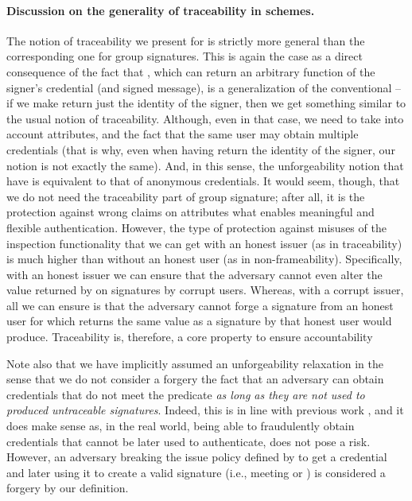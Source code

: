 \paragraph{Discussion on the generality of traceability in \UAS schemes.} %
The notion of traceability we present for \UAS is strictly more general than
the corresponding one for group signatures. This is again the case as a direct
consequence of the fact that \Inspect, which can return an arbitrary function
of the signer's credential (and signed message), is a generalization of the
conventional \Open -- if we make \Inspect return just the identity of the
signer, then we get something similar to the usual notion of traceability.
Although, even in that case, we need to take into account attributes, and the
fact that the same user may obtain multiple credentials (that is why, even when
having \Inspect return the identity of the signer, our notion is not exactly
the same). And, in this sense, the unforgeability notion that \UAS have is
equivalent to that of anonymous credentials. It would seem, though, that we do
not need the traceability part of group signature; after all, it is the
protection against wrong claims on attributes what enables meaningful and
flexible authentication. However, the type of protection against misuses of
the inspection functionality that we can get with an honest issuer (as in
traceability) is much higher than without an honest user (as in
non-frameability). Specifically, with an honest issuer we can ensure that
the adversary cannot even alter the value returned by \Inspect on signatures
by corrupt users. Whereas, with a corrupt issuer, all we can ensure is that
the adversary cannot forge a signature from an honest user for which \Inspect
returns the same value as a signature by that honest user would produce.
Traceability is, therefore, a core property to ensure accountability

Note also that we have implicitly assumed an unforgeability relaxation in the
sense that we do not consider a forgery the fact that an adversary can obtain
credentials that do not meet the \fissue predicate \emph{as long as they are
  not used to produced untraceable signatures}. Indeed, this is in line with
previous work \cite[Section 3.3.3]{ckl+15}, and it does make sense as, in the
real world, being able to fraudulently obtain credentials that cannot be later
used to authenticate, does not pose a risk. However, an adversary breaking
the issue policy defined by \fissue to get a credential and later using it to
create a valid signature (i.e., meeting \feval or \finsp) is considered a
forgery by our definition.

